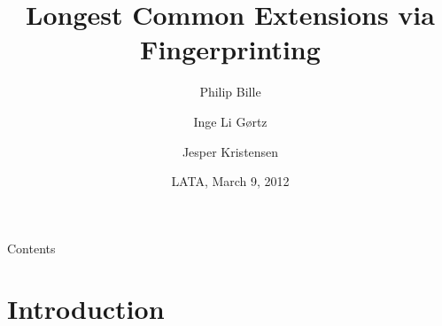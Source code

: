 \documentclass{beamer}
\title{Longest Common Extensions via Fingerprinting}
\author{Philip Bille \and Inge Li G{\o}rtz \and Jesper Kristensen}
\institute[DTU Informatics]{Technical University of Denmark\\DTU Informatics}
\date{LATA, March 9, 2012}
\begin{document}
\newcommand{\sortt}{\textit{sort}(n,\sigma)}
\newcommand{\LCE}{\textit{LCE}}
\newcommand{\NCA}{\textit{NCA}}
\newcommand{\RMQ}{\textit{RMQ}}
\newcommand{\SA}{\textit{SA}}
\newcommand{\SAinv}{\textit{SA}^{-1}} %
\newcommand{\SAi}{SA$^{-1}$} %
\newcommand{\LCP}{\textit{LCP}}
\newcommand{\LA}{\textit{LA}}
\newcommand{\suff}{\textit{suff}}
\newcommand{\logceil}{\lceil\log n\rceil}
\newcommand{\fprint}[1][k]{\ensuremath{\proc{Fingerprint}_{#1}}}
\newcommand{\fprintk}{\fprint[k]}
\newcommand{\RMQpq}[2]{RMQ\textless$#1$, $#2$\textgreater}
\newcommand{\RMQn}{\RMQpq{1}{n}}
\newcommand{\RMQq}{\RMQpq{n}{1}}
\newcommand{\RMQlog}{\RMQpq{n}{\log n}}

\begin{frame}
\titlepage
\end{frame}

\begin{frame}{Contents}
\tableofcontents
\end{frame}

\section{Introduction}
\end{document}
